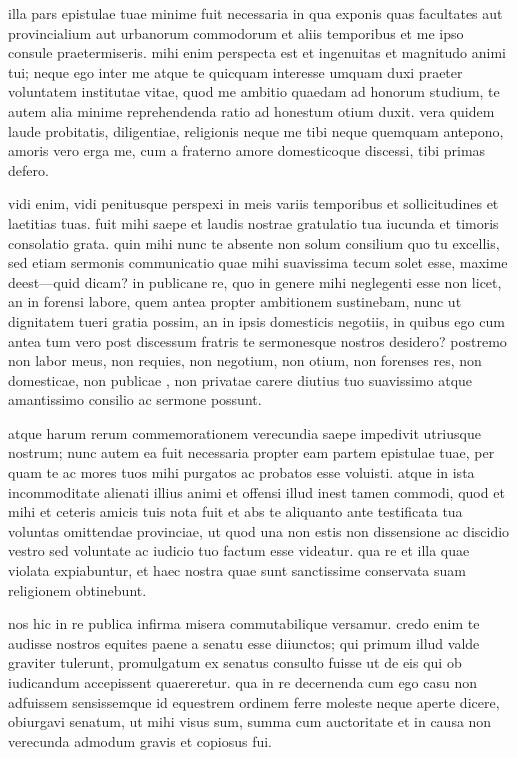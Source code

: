  illa pars epistulae tuae minime fuit necessaria in qua exponis quas facultates aut provincialium aut urbanorum commodorum et aliis temporibus et me ipso consule praetermiseris. mihi enim perspecta est et ingenuitas et magnitudo animi tui; neque ego inter me atque te quicquam interesse umquam duxi praeter voluntatem institutae vitae, quod me ambitio quaedam ad honorum studium, te autem alia minime reprehendenda ratio ad honestum otium duxit. vera quidem laude probitatis, diligentiae, religionis neque me tibi neque quemquam antepono, amoris vero erga me, cum a fraterno amore domesticoque discessi, tibi primas defero.

 vidi enim, vidi penitusque perspexi in meis variis temporibus et sollicitudines et laetitias tuas. fuit mihi saepe et laudis nostrae gratulatio tua iucunda et timoris consolatio grata. quin mihi nunc te absente non solum consilium quo tu excellis, sed etiam sermonis communicatio quae mihi suavissima tecum solet esse, maxime deest—quid dicam? in publicane re, quo in genere mihi neglegenti esse non licet, an in forensi labore, quem antea propter ambitionem sustinebam, nunc ut dignitatem tueri gratia possim, an in ipsis domesticis negotiis, in quibus ego cum antea tum vero post discessum fratris te sermonesque nostros desidero? postremo non labor meus, non requies, non negotium, non otium, non forenses res, non domesticae, non publicae , non privatae carere diutius tuo suavissimo atque amantissimo consilio ac sermone possunt.

 atque harum rerum commemorationem verecundia saepe impedivit utriusque nostrum; nunc autem ea fuit necessaria propter eam partem epistulae tuae, per quam te ac mores tuos mihi purgatos ac probatos esse voluisti. atque in ista incommoditate alienati illius animi et offensi illud inest tamen commodi, quod et mihi et ceteris amicis tuis nota fuit et abs te aliquanto ante testificata tua voluntas omittendae provinciae, ut quod una non estis non dissensione ac discidio vestro sed voluntate ac iudicio tuo factum esse videatur. qua re et illa quae violata expiabuntur, et haec nostra quae sunt sanctissime conservata suam religionem obtinebunt.

 nos hic in re publica infirma misera commutabilique versamur. credo enim te audisse nostros equites paene a senatu esse diiunctos; qui primum illud valde graviter tulerunt, promulgatum ex senatus consulto fuisse ut de eis qui ob iudicandum accepissent quaereretur. qua in re decernenda cum ego casu non adfuissem sensissemque id equestrem ordinem ferre moleste neque aperte dicere, obiurgavi senatum, ut mihi visus sum, summa cum auctoritate et in causa non verecunda admodum gravis et copiosus fui.

